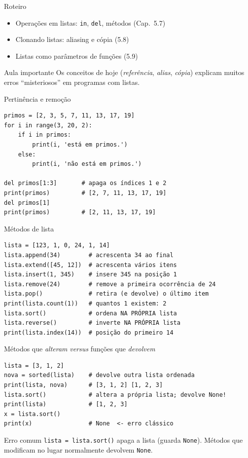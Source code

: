 \documentclass[aspectratio=169,10pt,t]{beamer}
\begin{document}
\capa

\begin{frame}{Roteiro}
  \begin{itemize}
    \item Operações em listas: \texttt{in}, \texttt{del}, métodos (Cap.~5.7)
    \item Clonando listas: aliasing e cópia (5.8)
    \item Listas como parâmetros de funções (5.9)
  \end{itemize}
  \begin{alertblock}{Aula importante}
    Os conceitos de hoje (\emph{referência}, \emph{alias}, \emph{cópia}) explicam muitos erros ``misteriosos'' em programas com listas.
  \end{alertblock}
\end{frame}

\begin{frame}[fragile]{Pertinência e remoção}
\begin{lstlisting}
primos = [2, 3, 5, 7, 11, 13, 17, 19]
for i in range(3, 20, 2):
    if i in primos:
        print(i, 'está em primos.')
    else:
        print(i, 'não está em primos.')

del primos[1:3]       # apaga os índices 1 e 2
print(primos)         # [2, 7, 11, 13, 17, 19]
del primos[1]
print(primos)         # [2, 11, 13, 17, 19]
\end{lstlisting}
\end{frame}

\begin{frame}[fragile]{Métodos de lista}
\begin{lstlisting}
lista = [123, 1, 0, 24, 1, 14]
lista.append(34)        # acrescenta 34 ao final
lista.extend([45, 12])  # acrescenta vários itens
lista.insert(1, 345)    # insere 345 na posição 1
lista.remove(24)        # remove a primeira ocorrência de 24
lista.pop()             # retira (e devolve) o último item
print(lista.count(1))   # quantos 1 existem: 2
lista.sort()            # ordena NA PRÓPRIA lista
lista.reverse()         # inverte NA PRÓPRIA lista
print(lista.index(14))  # posição do primeiro 14
\end{lstlisting}
\end{frame}

\begin{frame}[fragile]{Métodos que \emph{alteram} \emph{versus} funções que \emph{devolvem}}
\begin{lstlisting}
lista = [3, 1, 2]
nova = sorted(lista)    # devolve outra lista ordenada
print(lista, nova)      # [3, 1, 2] [1, 2, 3]
lista.sort()            # altera a própria lista; devolve None!
print(lista)            # [1, 2, 3]
x = lista.sort()
print(x)                # None  <- erro clássico
\end{lstlisting}
  \begin{alertblock}{Erro comum}
    \texttt{lista = lista.sort()} apaga a lista (guarda \texttt{None}). Métodos que modificam no lugar normalmente devolvem \texttt{None}.
  \end{alertblock}
\end{frame}
\end{document}
